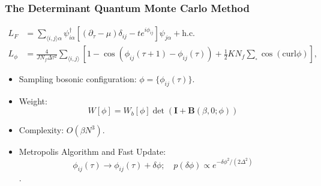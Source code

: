 \documentclass[xcolor=table, 10pt, aspectratio=43]{beamer}
\begin{document}
\begin{frame}
  \frametitle{The Determinant Quantum Monte Carlo Method}
  \begin{align*}
  L_F &= \sum_{\langle i,j \rangle\alpha}{\psi}^{\dagger}_{i\alpha} \left[(\partial_\tau -\mu)\delta_{ij}-t e^{i\phi_{ij}}   \right]   {\psi}_{j\alpha} + \text{h.c.}\\
  L_\phi &= \frac{4} {JN_{f}\Delta \tau ^2} \sum_{\langle i,j \rangle}
  \left[ 1-\cos(\phi_{ij}(\tau+1)-\phi_{ij}(\tau))
   +\frac{1}{2}K N_f\sum_{\square}\cos (\text{curl} \phi) \right],
\end{align*}
\begin{itemize}
  \item Sampling bosonic configuration: $\phi = \{\phi_{ij}(\tau)\}$.
  \item Weight:
  \[W[\phi] = W_b[\phi]\det(\mathbf I + \mathbf B(\beta,0;\phi))\]
  \item Complexity: $O(\beta N^3)$.
  \item Metropolis Algorithm and Fast Update:
  \[\phi_{ij}(\tau)\rightarrow\phi_{ij}(\tau)+\delta\phi;\quad p(\delta\phi)\propto e^{-\delta\phi^2/(2\Delta^2)}\].
\end{itemize}
\end{frame}
\end{document}
